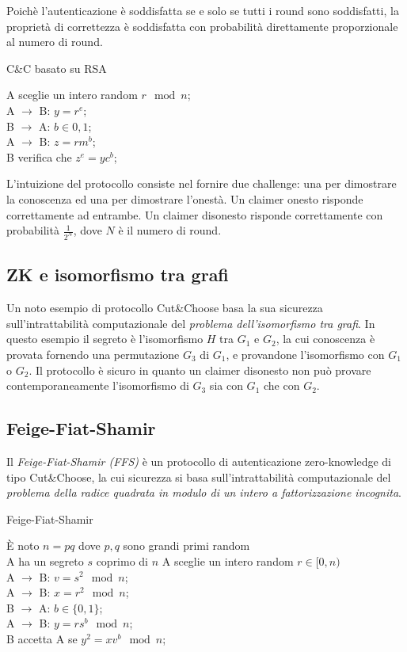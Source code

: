 Poichè l'autenticazione è soddisfatta se e solo se tutti i round sono soddisfatti, la proprietà di correttezza è soddisfatta con probabilità direttamente proporzionale al numero di round.

\bigskip
\begin{algorithm}[H]
  \caption{C\&C basato su RSA}
  \label{alg:authentication-zero-knowledge-cut-and-choose}
  \SetAlgoNoLine
  A sceglie un intero random $r \mod n$;\\
  A $\rightarrow$ B: $y=r^{e}$;\\
  B $\rightarrow$ A: $b \in {0,1}$;\\
  A $\rightarrow$ B: $z=rm^{b}$;\\
  B verifica che $z^{e}=yc^{b}$;
\end{algorithm}

L'intuizione del protocollo consiste nel fornire due challenge: una per dimostrare la conoscenza ed una per dimostrare l'onestà. Un claimer onesto risponde correttamente ad entrambe. Un claimer disonesto risponde correttamente con probabilità $\frac{1}{2^{N}}$, dove $N$ è il numero di round.


\subsection{ZK e isomorfismo tra grafi}
Un noto esempio di protocollo Cut\&Choose basa la sua sicurezza sull'intrattabilità computazionale del \textit{problema dell'isomorfismo tra grafi}. In questo esempio il segreto è l'isomorfismo $H$ tra $G_{1}$ e $G_{2}$, la cui conoscenza è provata fornendo una permutazione $G_{3}$ di $G_{1}$, e provandone l'isomorfismo con $G_{1}$ o $G_{2}$. Il protocollo è sicuro in quanto un claimer disonesto non può provare contemporaneamente l'isomorfismo di $G_{3}$ sia con $G_{1}$ che con $G_{2}$.


\subsection{Feige-Fiat-Shamir}
Il \textit{Feige-Fiat-Shamir (FFS)} è un protocollo di autenticazione zero-knowledge di tipo Cut\&Choose, la cui sicurezza si basa sull'intrattabilità computazionale del \textit{problema della radice quadrata in modulo di un intero a fattorizzazione incognita}.

\bigskip
\begin{algorithm}[H]
  \caption{Feige-Fiat-Shamir}
  \label{alg:authentication-zero-knowledge-feige-fiat-shamir}
  \SetAlgoNoLine
  È noto $n=pq$ dove $p,q$ sono grandi primi random\\
  A ha un segreto $s$ coprimo di $n$
  A sceglie un intero random $r \in [0,n)$\\
  A $\rightarrow$ B: $v=s^{2} \mod n$;\\
  A $\rightarrow$ B: $x=r^{2} \mod n$;\\
  B $\rightarrow$ A: $b \in \{0,1\}$;\\
  A $\rightarrow$ B: $y=rs^{b} \mod n$;\\
  B accetta A se $y^{2}=xv^{b} \mod n$;\\
\end{algorithm}


